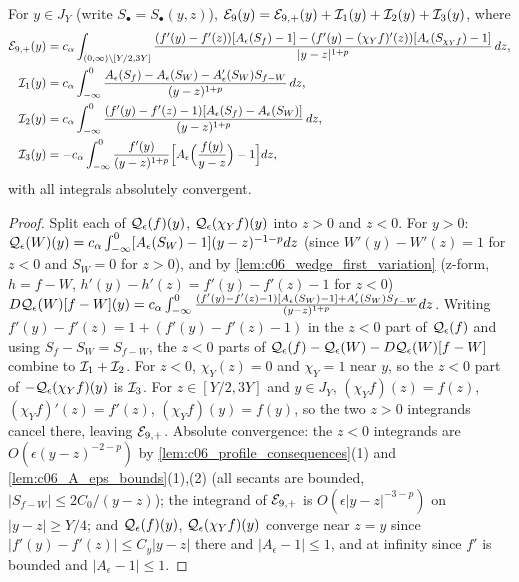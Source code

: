 \begin{lemma}[Splitting of $\mc E_9$]
  \label{lem:c06_E9_split}
  For $y\in J_Y$ (write $S_\bullet=S_\bullet(y,z)$),
  $\mathcal{E}_9(y)=\mathcal{E}_{9,+}(y)+\mathcal{I}_1(y)+\mathcal{I}_2(y)+\mathcal{I}_3(y)$, where
  \begin{align*}
    \mathcal{E}_{9,+}(y)&=c_\alpha\int_{(0,\infty)\setminus[Y/2,3Y]}\frac{(f'(y)-f'(z))[A_\epsilon(S_f)-1]-(f'(y)-(\chi_Yf)'(z))[A_\epsilon(S_{\chi_Yf})-1]}{|y-z|^{1+p}}\,dz,\\
    \mathcal{I}_1(y)&=c_\alpha\int_{-\infty}^0\frac{A_\epsilon(S_f)-A_\epsilon(S_W)-A_\epsilon'(S_W)S_{f-W}}{(y-z)^{1+p}}\,dz,\\
    \mathcal{I}_2(y)&=c_\alpha\int_{-\infty}^0\frac{(f'(y)-f'(z)-1)[A_\epsilon(S_f)-A_\epsilon(S_W)]}{(y-z)^{1+p}}\,dz,\\
    \mathcal{I}_3(y)&=-c_\alpha\int_{-\infty}^0\frac{f'(y)}{(y-z)^{1+p}}\Bigl[A_\epsilon\Bigl(\frac{f(y)}{y-z}\Bigr)-1\Bigr]dz,
  \end{align*}
  with all integrals absolutely convergent.
\end{lemma}
\begin{proof}
  Split each of $\mathcal{Q}_\epsilon(f)(y)$, $\mathcal{Q}_\epsilon(\chi_Yf)(y)$ into $z>0$ and $z<0$. For $y>0$:
  $\mathcal{Q}_\epsilon(W)(y)=c_\alpha\int_{-\infty}^0[A_\epsilon(S_W)-1](y-z)^{-1-p}dz$ (since $W'(y)-W'(z)=1$ for $z<0$ and
  $S_W=0$ for $z>0$), and by \cref{lem:c06_wedge_first_variation} (z-form, $h=f-W$, $h'(y)-h'(z)=f'(y)-f'(z)-1$ for $z<0$)
  $D\mathcal{Q}_\epsilon(W)[f-W](y)=c_\alpha\int_{-\infty}^0\frac{(f'(y)-f'(z)-1)[A_\epsilon(S_W)-1]+A_\epsilon'(S_W)S_{f-W}}{(y-z)^{1+p}}dz$.
  Writing $f'(y)-f'(z)=1+(f'(y)-f'(z)-1)$ in the $z<0$ part of $\mathcal{Q}_\epsilon(f)$ and using $S_f-S_W=S_{f-W}$, the $z<0$
  parts of $\mathcal{Q}_\epsilon(f)-\mathcal{Q}_\epsilon(W)-D\mathcal{Q}_\epsilon(W)[f-W]$ combine to $\mathcal{I}_1+\mathcal{I}_2$.
  For $z<0$, $\chi_Y(z)=0$ and $\chi_Y=1$ near $y$, so the $z<0$ part of $-\mathcal{Q}_\epsilon(\chi_Yf)(y)$ is $\mathcal{I}_3$.
  For $z\in[Y/2,3Y]$ and $y\in J_Y$, $(\chi_Yf)(z)=f(z)$, $(\chi_Yf)'(z)=f'(z)$, $(\chi_Y f)(y)=f(y)$, so the
  two $z>0$ integrands cancel there, leaving $\mathcal{E}_{9,+}$. Absolute convergence: the $z<0$ integrands are $O(\epsilon(y-z)^{-2-p})$ by
  \cref{lem:c06_profile_consequences}(1) and \cref{lem:c06_A_eps_bounds}(1),(2) (all secants are bounded, $|S_{f-W}|\le 2C_0/(y-z)$);
  the integrand of $\mathcal{E}_{9,+}$ is $O(\epsilon|y-z|^{-3-p})$ on $|y-z|\ge Y/4$; and $\mathcal{Q}_\epsilon(f)(y)$,
  $\mathcal{Q}_\epsilon(\chi_Yf)(y)$ converge near $z=y$ since $|f'(y)-f'(z)|\le C_y|y-z|$ there and $|A_\epsilon-1|\le1$,
  and at infinity since $f'$ is bounded and $|A_\epsilon-1|\le1$.
\end{proof}

